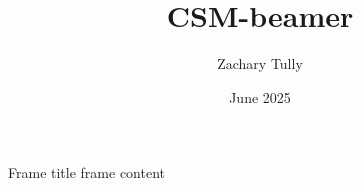 \documentclass[aspectratio=169, 9pt]{beamer}
\title{CSM-beamer}
\author{Zachary Tully}
\date{June 2025}
\begin{document}
\begin{frame}{Frame title}
    frame content
\end{frame}
\end{document}
